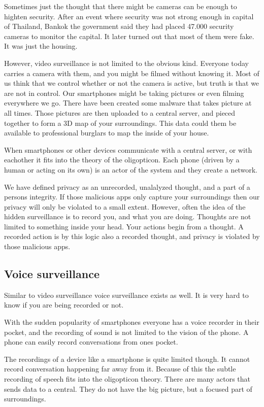 Sometimes just the thought that there might be cameras can be enough to highten security. After an event where security was not strong enough in capital of Thailand, Bankok the government said they had placed 47.000 security cameras to monitor the capital. It later turned out that most of them were fake. It was just the housing.\cite{website:bangkok-security}

However, video surveillance is not limited to the obvious kind. Everyone today carries a camera with them, and you might be filmed without knowing it. Most of us think that we control whether or not the camera is active, but truth is that we are not in control. Our smartphones might be taking pictures or even filming everywhere we go. There have been created some malware that takes picture at all times. Those pictures are then uploaded to a central server, and pieced together to form a 3D map of your surroundings. This data could them be available to professional burglars to map the inside of your house.\cite{website:placeraider}

When smartphones or other devices communicate with a central server, or with eachother it fits into the theory of the oligopticon. Each phone (driven by a human or acting on its own) is an actor of the system and they create a network.

We have defined privacy as an unrecorded, unalalyzed thought, and a part of a persons integrity. If those malicious apps only capture your surroundings then our privacy will only be violated to a small extent. However, often the idea of the hidden surveillance is to record you, and what you are doing. Thoughts are not limited to something inside your head. Your actions begin from a thought. A recorded action is by this logic also a recorded thought, and privacy is violated by those malicious apps.

\subsection{Voice surveillance}
Similar to video surveillance voice surveillance exists as well. It is very hard to know if you are being recorded or not.

With the sudden popularity of smartphones everyone has a voice recorder in their pocket, and the recording of sound is not limited to the vision of the phone. A phone can easily record conversations from ones pocket.\cite{website:carrier-iq}

The recordings of a device like a smartphone is quite limited though. It cannot record conversation happening far away from it. Because of this the subtle recording of speech fits into the oligopticon theory. There are many actors that sends data to a central. They do not have the big picture, but a focused part of surroundings.

